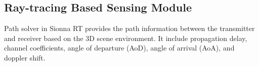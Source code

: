 \subsection{Ray-tracing Based Sensing Module}
\label{subsec:rt_based_sensing_module}

Path solver in Sionna RT provides the path information between the transmitter and receiver based on the 3D scene environment.
It include propagation delay, channel coefficients, angle of departure (AoD), angle of arrival (AoA), and doppler shift.









